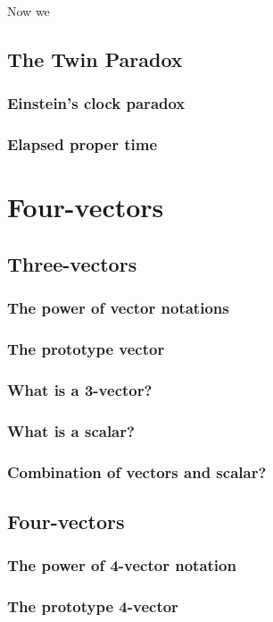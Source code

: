 \documentclass[a4paper,11pt]{article}
\numberwithin{equation}{section}
\begin{document}
 Now we 
 \subsection{The Twin Paradox}
 \subsubsection{Einstein's clock paradox}
 \subsubsection{Elapsed proper time}
 
 \newpage
 
 \section{Four-vectors}
 \subsection{Three-vectors}
 \subsubsection{The power of vector notations}
 \subsubsection{The prototype vector}
 \subsubsection{What is a 3-vector?}
 \subsubsection{What is a scalar?}
 \subsubsection{Combination of vectors and scalar?}
 
 \subsection{Four-vectors}
 \subsubsection{The power of 4-vector notation}
 \subsubsection{The prototype 4-vector}
\end{document}
